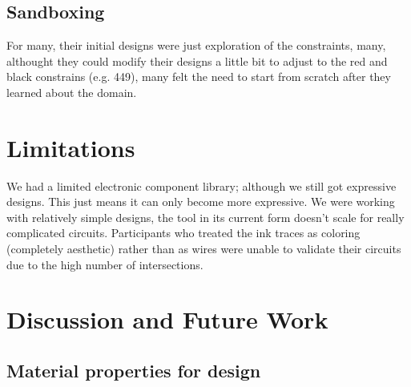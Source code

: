\documentclass{sigchi}
\begin{document}
  \subsection{Sandboxing}
    For many, their initial designs were just exploration of the constraints, many, althought they could modify their designs a little bit to adjust to the red and black constrains (e.g. 449), many felt the need to start from scratch after they learned about the domain.

\section{Limitations}
  We had a limited electronic component library; although we still got expressive designs. This just means it can only become more expressive. We were working with relatively simple designs, the tool in its current form doesn't scale for really complicated circuits. Participants who treated the ink traces as coloring (completely aesthetic) rather than as wires were unable to validate their circuits due to the high number of intersections.


\section {Discussion and Future Work}


\subsection{Material properties for design}
\end{document}
